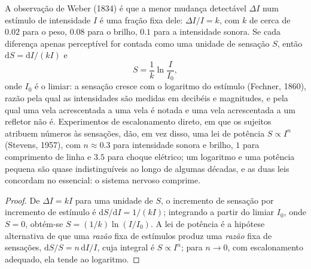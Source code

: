 \begin{theorem}\label{thm:b3:sensory-systems:weber}
A observação de Weber (1834) é que a menor mudança detectável $\Delta I$
num estímulo de intensidade $I$ é uma fração fixa dele: $\Delta I/I = k$,
com $k$ de cerca de $0.02$ para o peso, $0.08$ para o brilho, $0.1$ para
a intensidade sonora. Se cada diferença apenas perceptível for contada
como uma unidade de sensação $S$, então $\mathrm{d}S = \mathrm{d}I/
(kI)$ e
\[
S = \frac{1}{k}\ln\frac{I}{I_{0}} ,
\]
onde $I_{0}$ é o limiar: a sensação cresce com o logaritmo do estímulo
(Fechner, 1860), razão pela qual as intensidades são medidas em
decibéis e magnitudes, e pela qual uma vela acrescentada a uma vela é
notada e uma vela acrescentada a um refletor não é. Experimentos de
escalonamento direto, em que os sujeitos atribuem números às sensações,
dão, em vez disso, uma lei de potência $S \propto I^{n}$ (Stevens,
1957), com $n \approx
0.3$ para intensidade sonora e brilho, $1$ para
comprimento de linha e $3.5$ para choque elétrico; um logaritmo e uma
potência pequena são quase indistinguíveis ao longo de algumas décadas,
e as duas leis concordam no essencial: o sistema nervoso comprime.
\end{theorem}
\begin{proof}
De $\Delta I = kI$ para uma unidade de $S$, o incremento de sensação por
incremento de estímulo é $\mathrm{d}S/\mathrm{d}I = 1/(kI)$; integrando
a partir do limiar $I_{0}$, onde $S = 0$, obtém-se $S = (1/k)
\ln(I/I_{0})$. A lei de potência é a hipótese alternativa de que uma
\emph{razão} fixa de estímulos produz uma \emph{razão} fixa de
sensações, $\mathrm{d}S/S = n\,\mathrm{d}I/I$, cuja integral é $S \propto I^{n}$; para $n \to 0$, com escalonamento adequado, ela tende ao
logaritmo.
\end{proof}

